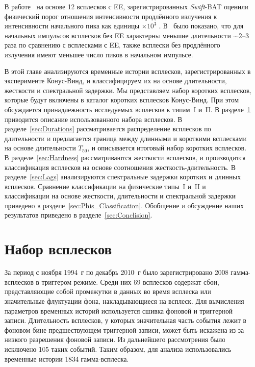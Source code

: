 В работе~\citep{Norris_2010ApJ} на основе 12 всплесков с EE, зарегистрированных 
\textit{Swift}-BAT оценили физический порог отношения интенсивности продлённого излучения 
к интенсивности начального пика как единицы $\times 10^3$ . В~\citep{Norris_2011ApJ} было показано, 
что для начальных импульсов всплесков без EE характерны меньшие длительности $\sim 2$--3 
раза по сравнению с всплесками с EE, также всплески без продлённого излучения 
имеют меньшее число пиков в начальном импульсе.

В этой главе анализируются временные истории всплесков, зарегистрированных в 
эксперименте Конус-Винд, и классифицируем их на основе длительности, жесткости и 
спектральной задержки. Мы представляем набор коротких всплесков, которые будут 
включены в каталог коротких всплесков Конус-Винд. При этом обсуждается принадлежность 
исследуемых всплесков к типам~I и~II. В разделе~\ref{sec:GRB_sample} приводится 
описание использованного набора всплесков. 
В разделе~\ref{sec:Durations} рассматривается распределение всплесков по длительности 
и предлагается граница между длинными и короткими всплесками на основе 
длительности $T_{50}$, и описывается итоговый набор коротких всплесков. 
В разделе~\ref{sec:Hardness} рассматриваются жесткости всплесков, и производится 
классификация всплесков на основе соотношения жесткость-длительность. 
В разделе~\ref{sec:Lags} анализируются спектральные задержки коротких и длинных всплесков. 
Сравнение классификации на физические типы~I и~II и классификации на основе жесткости, 
длительности и спектральной задержки приведено в разделе~\ref{sec:Phis_Classification}. 
Обобщение и обсуждение наших результатов приведено в разделе~\ref{sec:Conclision}.  

\section{Набор всплесков}\label{sec:GRB_sample}
За период с ноября 1994~г по декабрь 2010~г было зарегистрировано 2008 гамма-всплесков 
в триггером режиме. Среди них 69 всплесков содержат сбои, представляющие собой 
промежутки в данных во время всплеска или значительные флуктуации фона, 
накладывающиеся на всплеск. Для вычисления параметров временных историй используется 
сшивка фоновой и триггерной записи. Длительность всплесков, у которых значительная 
часть события лежит в фоновом бине предшествующем триггерной записи, может быть 
искажена из-за низкого разрешения фоновой записи. Из дальнейшего рассмотрения 
было исключено 105 таких событий. Таким образом, для анализа использовались временные 
истории 1834 гамма-всплеска. 

